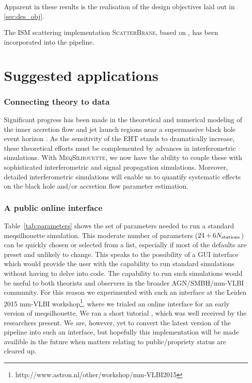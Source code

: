 Apparent in these results is the realisation of the design objectives laid out in \ref{sec:des_obj}.

The ISM scattering implementation \textsc{ScatterBrane}, based on \citet*{Johnson_2015a}, has been incorporated into the pipeline.


\section{Suggested applications}

\subsubsection{Connecting theory to data}
Significant progress has been made in the theoretical and numerical modeling of the inner accretion flow and jet launch regions near a supermassive black hole event horizon
\citep[e.g.][]{Zanna_2007,Etienne_2010,Dexter_2013,Moscibrodzka_2014, McKinney_2014}. As the sensitivity of the EHT stands to dramatically increase, these theoretical efforts must be complemented by advances in interferometric simulations. With \textsc{MeqSilhouette}, we now have the ability to couple these with sophisticated interferometric and signal propagation simulations.  Moreover, detailed interferometric simulations will enable us to quantify systematic effects on the black hole and/or accretion flow parameter estimation.

\subsubsection{A public online interface}
Table~\ref{tab:parameters} shows the set of parameters needed to run a standard {\sc meqsilhouette} simulation. This moderate number of parameters ($24+6N_{\rm stations}$) can be quickly chosen or selected from a list, especially if most of the defaults are preset and unlikely to change. This speaks to the possibility of a GUI interface which would provide the user with the capability to run standard simulations without having to delve into code. The capability to run such simulations would be useful to both theorists and observers in the broader AGN/SMBH/mm-VLBI community. For this reason we experimented with such an interface at the Leiden 2015 mm-VLBI workshop\footnote{http://www.astron.nl/other/workshop/mm-VLBI2015}, where we trialed an online interface for an early version of {\sc meqsilhouette}. We ran a short tutorial , which was well received by the researchers present. We are, however, yet to convert the latest version of the pipeline \citep{Blecher_2016} into such an interface, but hopefully this implementation will be made availible in the future when matters relating to public/propriety status are cleared up.



